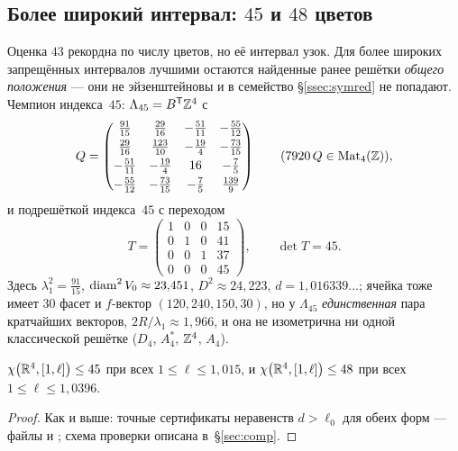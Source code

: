 \subsection{Более широкий интервал: $45$ и $48$ цветов}\label{ssec:wide45}

Оценка $43$ рекордна по числу цветов, но её интервал узок. Для более широких
запрещённых интервалов лучшими остаются найденные ранее решётки \emph{общего
положения} --- они не эйзенштейновы и в семейство \S\ref{ssec:symred} не
попадают. Чемпион индекса~$45$: $\Lambda_{45}=B^{\mathsf T}\mathbb{Z}^4$ с
\begin{equation}\label{eq:gram}
Q=\begin{pmatrix}
\tfrac{91}{15}  & \tfrac{29}{16} & -\tfrac{51}{11} & -\tfrac{55}{12}\\[3pt]
\tfrac{29}{16}  & \tfrac{123}{10}& -\tfrac{19}{4}  & -\tfrac{73}{15}\\[3pt]
-\tfrac{51}{11} & -\tfrac{19}{4} & 16              & -\tfrac{7}{5}\\[3pt]
-\tfrac{55}{12} & -\tfrac{73}{15}& -\tfrac{7}{5}   & \tfrac{139}{9}
\end{pmatrix}
\qquad(7920\,Q\in\mathrm{Mat}_4(\mathbb{Z})),
\end{equation}
и подрешёткой индекса~$45$ с переходом
\begin{equation}\label{eq:hnf}
T=\begin{pmatrix}1&0&0&15\\0&1&0&41\\0&0&1&37\\0&0&0&45\end{pmatrix},
\qquad\det T=45 .
\end{equation}
Здесь $\lambda_1^2=\tfrac{91}{15}$, $\operatorname{diam}^2V_0\approx23{,}451$,
$D^2\approx24{,}223$, $d=1{,}016339\ldots$; ячейка тоже имеет $30$ фасет и
$f$-вектор $(120,240,150,30)$, но у $\Lambda_{45}$ \emph{единственная} пара
кратчайших векторов, $2R/\lambda_1\approx1{,}966$, и она не изометрична ни
одной классической решётке ($D_4$, $A_4^*$, $\mathbb{Z}^4$, $A_4$).

\begin{keybox}
\begin{theorem}\label{thm:main}
$\chi\bigl(\mathbb{R}^4,[1,\ell]\bigr)\le45$ при всех $1\le\ell\le1{,}015$, и
$\chi\bigl(\mathbb{R}^4,[1,\ell]\bigr)\le48$ при всех $1\le\ell\le1{,}0396$.
\end{theorem}
\end{keybox}
\begin{proof}
Как и выше: точные сертификаты неравенств $d>\ell_0$ для обеих форм ---
файлы  и
; схема
проверки описана в~\S\ref{sec:comp}.
\end{proof}

